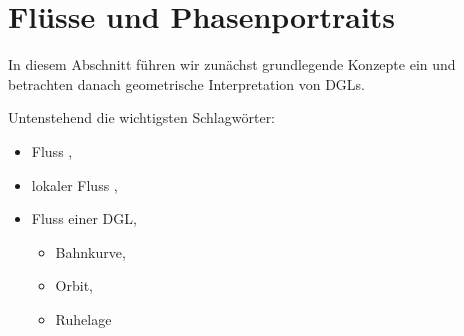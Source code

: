 \documentclass[letterpaper,10pt,english]{jupyterBook}
\begin{document}
\section{Flüsse und Phasenportraits}
\label{\detokenize{ode/fluesse:flusse-und-phasenportraits}}\label{\detokenize{ode/fluesse::doc}}
In diesem Abschnitt führen wir zunächst grundlegende Konzepte ein und betrachten danach geometrische Interpretation von DGLs.

Untenstehend die wichtigsten Schlagwörter:
\begin{itemize}
\item {} 
Fluss {\hyperref[\detokenize{ode/fluesse:def:Fluss}]{}},

\item {} 
lokaler Fluss {\hyperref[\detokenize{ode/fluesse:def:LokFluss}]{}},

\item {} 
Fluss einer DGL,
\begin{itemize}
\item {} 
Bahnkurve,

\item {} 
Orbit,

\item {} 
Ruhelage

\end{itemize}

\end{itemize}
\end{document}
